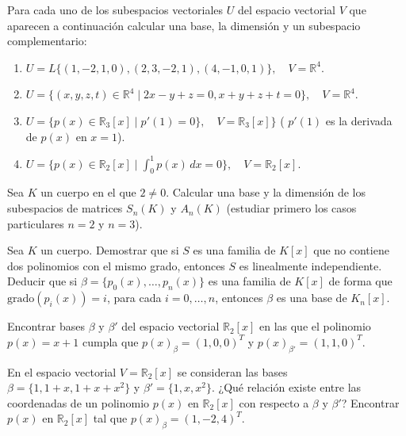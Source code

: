 \begin{ejercicio}Para cada uno de los subespacios vectoriales \( U \) del espacio vectorial \( V \) que aparecen a continuación calcular una base, la dimensión y un subespacio complementario:
	\begin{enumerate}
		\item \( U = L\{ (1, -2, 1, 0), (2, 3, -2, 1), (4, -1, 0, 1) \}, \quad V = \mathbb{R}^4 \).

		\item \( U = \{ (x,y,z,t) \in \mathbb{R}^4 \mid 2x - y + z = 0, x + y + z + t = 0 \}, \quad V = \mathbb{R}^4 \).
		\item \( U = \{ p(x) \in \mathbb{R}_3[x] \mid p'(1) = 0 \}, \quad V = \mathbb{R}_3[x] \} \) ( \( p'(1) \) es la derivada de \( p(x) \) en \( x = 1 \)).
		\item \( U = \{ p(x) \in \mathbb{R}_2[x] \mid \int_{0}^{1} p(x) \, dx = 0 \}, \quad V = \mathbb{R}_2[x] \).
	\end{enumerate}
\end{ejercicio}



\begin{ejercicio} Sea \( K \) un cuerpo en el que \( 2 \neq 0 \). Calcular una base y la dimensión de los subespacios de matrices \( S_n(K) \) y \( A_n(K) \) (estudiar primero los casos particulares \( n = 2 \) y \( n = 3 \)).
\end{ejercicio}


\begin{ejercicio} Sea \( K \) un cuerpo. Demostrar que si \( S \) es una familia de \( K[x] \) que no contiene dos polinomios con el mismo grado, entonces \( S \) es linealmente independiente. Deducir que si \( \beta = \{ p_0(x), \ldots, p_n(x) \} \) es una familia de \( K[x] \) de forma que \( \text{grado}(p_i(x)) = i \), para cada \( i = 0, \ldots, n \), entonces \( \beta \) es una base de \( K_n[x] \).
\end{ejercicio}


\begin{ejercicio} Encontrar bases \( \beta \) y \( \beta' \) del espacio vectorial \( \mathbb{R}_2[x] \) en las que el polinomio \( p(x) = x + 1 \) cumpla que \( p(x)_\beta = (1, 0, 0)^T \) y \( p(x)_{\beta'} = (1, 1, 0)^T \).
\end{ejercicio}


\begin{ejercicio} En el espacio vectorial \( V = \mathbb{R}_2[x] \) se consideran las bases \( \beta = \{1, 1 + x, 1 + x + x^2\} \) y \( \beta' = \{1, x, x^2\} \). ¿Qué relación existe entre las coordenadas de un polinomio \( p(x) \) en \( \mathbb{R}_2[x] \) con respecto a \( \beta \) y \( \beta' \)? Encontrar \( p(x) \) en \( \mathbb{R}_2[x] \) tal que \( p(x)_\beta = (1, -2, 4)^T \).
\end{ejercicio}


